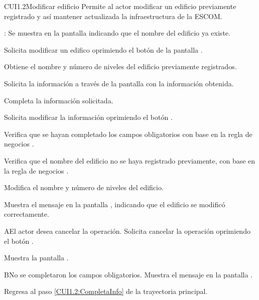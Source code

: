 \begin{UseCase}{CUI1.2}{Modificar edificio}{	
	Permite al actor modificar un edificio previamente registrado y así mantener actualizada la infraestructura de la ESCOM.
}
{\begin{UClist}
			\UCli {}: Se muestra en la pantalla  indicando que el nombre del edificio ya existe.
		\end{UClist}
	}
\end{UseCase}

\begin{UCtrayectoria}
	\UCpaso [\UCactor] Solicita modificar un edifico oprimiendo el botón  de la pantalla . 
	
	\UCpaso [\UCsist] Obtiene el nombre y número de niveles del edificio previamente registrados.
	
	\UCpaso [\UCsist] Solicita la información a través de la pantalla  con la información obtenida.
	
	\UCpaso [\UCactor] Completa la información solicitada. \label{CUI1.2:CompletaInfo}
	
	\UCpaso [\UCactor] Solicita modificar la información oprimiendo el botón . 
	
	\UCpaso [\UCsist] Verifica que se hayan completado los campos obligatorios con base en la regla de negocios . 
	
	\UCpaso [\UCsist] Verifica que el nombre del edificio no se haya registrado previamente, con base en la regla de negocios . 
	
	\UCpaso [\UCsist] Modifica el nombre y número de niveles del edificio.
	
	\UCpaso [\UCsist] Muestra el mensaje  en la pantalla , indicando que el edificio se modificó correctamente.	
	
\end{UCtrayectoria}


\begin{UCtrayectoriaA}{A}{El actor desea cancelar la operación.}
	\UCpaso [\UCactor] Solicita cancelar la operación oprimiendo el botón .
	
	\UCpaso [\UCsist] Muestra la pantalla . 
\end{UCtrayectoriaA}

\begin{UCtrayectoriaA}{B}{No se completaron los campos obligatorios.}
	\UCpaso [\UCsist] Muestra el mensaje  en la pantalla .
	
	\UCpaso Regresa al paso \ref{CUI1.2:CompletaInfo} de la trayectoria principal.
\end{UCtrayectoriaA}

